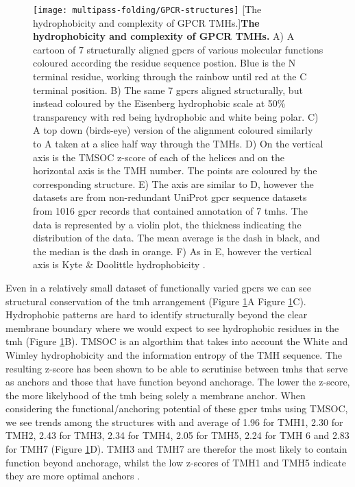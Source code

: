\begin{figure}[!ht]
\centering
\texttt{[image: multipass-folding/GPCR-structures]}
		[The hydrophobicity and complexity of GPCR TMHs.]{\textbf{The hydrophobicity and complexity of GPCR TMHs.}
    A) A cartoon of 7 structurally aligned \gls{gpcr}s of various molecular functions coloured according the residue sequence postion.
    Blue is the N terminal residue, working through the rainbow until red at the C terminal position.
    B) The same 7 \gls{gpcr}s aligned structurally, but instead coloured by the Eisenberg hydrophobic scale \cite{Eisenberg1984} at 50\% transparency with red being hydrophobic and white being polar.
    C) A top down (birds-eye) version of the alignment coloured similarly to A taken at a slice half way through the TMHs.
    D) On the vertical axis is the TMSOC z-score of each of the helices and on the horizontal axis is the TMH number.
    The points are coloured by the corresponding structure.
    E) The axis are similar to D, however the datasets are from non-redundant UniProt \gls{gpcr} sequence datasets from 1016 \gls{gpcr} records that contained annotation of 7 \gls{tmh}s.
    The data is represented by a violin plot, the thickness indicating the distribution of the data.
    The mean average is the dash in black, and the median is the dash in orange.
    F) As in E, however the vertical axis is Kyte \& Doolittle hydrophobicity \cite{Kyte1982}.}

\label{fig:GPCR-structures}
\end{figure}

Even in a relatively small dataset of functionally varied \gls{gpcr}s we can see structural conservation of the \gls{tmh} arrangement (Figure \ref{fig:GPCR-structures}A Figure \ref{fig:GPCR-structures}C).
Hydrophobic patterns are hard to identify structurally beyond the clear membrane boundary where we would expect to see hydrophobic residues in the \gls{tmh} (Figure \ref{fig:GPCR-structures}B).
TMSOC \cite{Wong2011, Wong2012} is an algorthim that takes into account the White and Wimley hydrophobicity \cite{White1999} and the information entropy of the TMH sequence.
The resulting z-score has been shown to be able to scrutinise between \gls{tmh}s that serve as anchors and those that have function beyond anchorage.
The lower the z-score, the more likelyhood of the \gls{tmh} being solely a membrane anchor.
When considering the functional/anchoring potential of these \gls{gpcr} \gls{tmh}s  using TMSOC, we see trends among the structures with and average of 1.96 for TMH1, 2.30 for TMH2, 2.43 for TMH3, 2.34 for TMH4, 2.05 for TMH5, 2.24 for TMH 6 and 2.83 for TMH7 (Figure \ref{fig:GPCR-structures}D).
TMH3 and TMH7 are therefor the most likely to contain function beyond anchorage, whilst the low z-scores of TMH1 and TMH5 indicate they are more optimal anchors \cite{Baker2017}.

